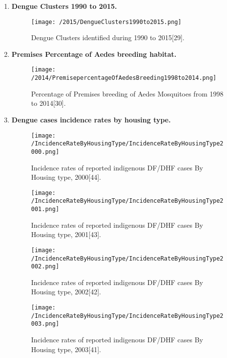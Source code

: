 \documentclass[11pt]{exam}
\begin{document}
\begin{questions}
\begin{enumerate}
\item \textbf{Dengue Clusters 1990 to 2015.}
\begin{figure}[H]
  \centering
   \texttt{[image: /2015/DengueClusters1990to2015.png]} 
  \caption{Dengue Clusters identified during 1990 to 2015[29].}
   \label{Dengue Clusters in Singapore 1990-2015}
\end{figure} 

\newpage
\item \textbf{Premises Percentage of Aedes breeding habitat.}
\begin{figure}[H]
  \centering
   \texttt{[image: /2014/PremisepercentageOfAedesBreeding1998to2014.png]} 
  \caption{Percentage of Premises breeding of Aedes Mosquitoes from 1998 to 2014[30].}
   \label{Aedes Mosquito Breeding}
\end{figure} 

\newpage
\item \textbf{Dengue cases incidence rates by housing type.}
\begin{figure}[H]
  \centering
   \texttt{[image: /IncidenceRateByHousingType/IncidenceRateByHousingType2000.png]} 
  \caption{Incidence rates of reported indigenous DF/DHF cases By Housing type, 2000[44].}
   \label{Incidence rate of indigenous DF/DHF cases by housing type.}
\end{figure} 

\begin{figure}[H]
  \centering
   \texttt{[image: /IncidenceRateByHousingType/IncidenceRateByHousingType2001.png]} 
  \caption{Incidence rates of reported indigenous DF/DHF cases By Housing type, 2001[43].}
   \label{Incidence rate of indigenous DF/DHF cases by housing type.}
\end{figure} 

\begin{figure}[H]
  \centering
   \texttt{[image: /IncidenceRateByHousingType/IncidenceRateByHousingType2002.png]} 
  \caption{Incidence rates of reported indigenous DF/DHF cases By Housing type, 2002[42].}
   \label{Incidence rate of indigenous DF/DHF cases by housing type.}
\end{figure} 

\begin{figure}[H]
  \centering
   \texttt{[image: /IncidenceRateByHousingType/IncidenceRateByHousingType2003.png]} 
  \caption{Incidence rates of reported indigenous DF/DHF cases By Housing type, 2003[41].}
   \label{Incidence rate of indigenous DF/DHF cases by housing type.}
\end{figure} 


\end{enumerate}
\end{questions}
\end{document}
